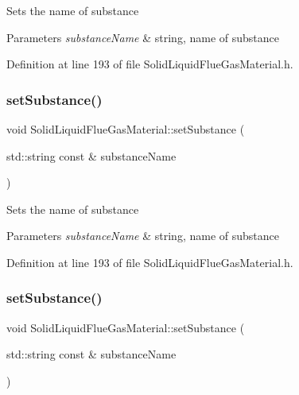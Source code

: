 Sets the name of substance 
\begin{DoxyParams}{Parameters}
{\em substance\+Name} & string, name of substance \\
\hline
\end{DoxyParams}


Definition at line 193 of file Solid\+Liquid\+Flue\+Gas\+Material.\+h.

\mbox{\label{class_solid_liquid_flue_gas_material_a54be915432c1300c4d8eaf7bf2be361f}} 
\subsubsection{\texorpdfstring{set\+Substance()}{setSubstance()}\hspace{0.1cm}{\footnotesize\ttfamily [2/3]}}
{\footnotesize\ttfamily void Solid\+Liquid\+Flue\+Gas\+Material\+::set\+Substance (\begin{DoxyParamCaption}\item[{std\+::string const \&}]{substance\+Name }\end{DoxyParamCaption})\hspace{0.3cm}{\ttfamily [inline]}}

Sets the name of substance 
\begin{DoxyParams}{Parameters}
{\em substance\+Name} & string, name of substance \\
\hline
\end{DoxyParams}


Definition at line 193 of file Solid\+Liquid\+Flue\+Gas\+Material.\+h.

\mbox{\label{class_solid_liquid_flue_gas_material_a54be915432c1300c4d8eaf7bf2be361f}} 
\subsubsection{\texorpdfstring{set\+Substance()}{setSubstance()}\hspace{0.1cm}{\footnotesize\ttfamily [3/3]}}
{\footnotesize\ttfamily void Solid\+Liquid\+Flue\+Gas\+Material\+::set\+Substance (\begin{DoxyParamCaption}\item[{std\+::string const \&}]{substance\+Name }\end{DoxyParamCaption})\hspace{0.3cm}{\ttfamily [inline]}}

